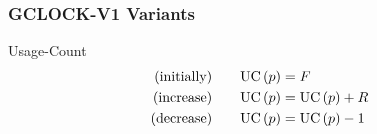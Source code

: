 



\begin{frame}
    \frametitle{GCLOCK-V1 Variants}


    \begin{block}{Usage-Count}
        \vspace{-2em}
        \begin{align*}
            \text{(initially)\qquad}\text{UC}\left(p\right) &= F\\
            \text{(increase)\qquad}\text{UC}\left(p\right) &= \text{UC}\left(p\right) + R\\
            \text{(decrease)\qquad}\text{UC}\left(p\right) &= \text{UC}\left(p\right) - 1
        \end{align*}
        \vspace{-1.5em}
    \end{block}


\end{frame}
